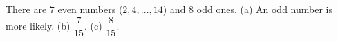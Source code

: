 There are $7$ even numbers ($2,4,\dots,14$) and $8$ odd ones. (a) An odd number is more likely. (b) $\boxed{\dfrac7{15}}$. (c) $\boxed{\dfrac8{15}}$.
